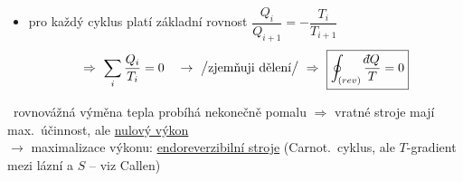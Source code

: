 \begin{itemize}
  \item pro každý  cyklus platí základní rovnost \quad $\dfrac{Q_i}{Q_{i+1}} = -\dfrac{T_i}{T_{i+1}}$
  \[
    \Rightarrow\ \sum_i\frac{Q_i}{T_i} = 0 \quad\to\ \big/\text{zjemňuji dělení}\big/ \ \Rightarrow\
    \boxed{\oint_{(rev)}\frac{\dbar Q}{T} = 0}
  \]
\end{itemize}

\pozor{!}\ rovnovážná výměna tepla probíhá nekonečně pomalu $\Rightarrow$ vratné stroje mají max.\ účinnost, ale \underline{nulový výkon} \\
$\to$ maximalizace výkonu: \underline{endoreverzibilní stroje} (Carnot.\ cyklus, ale $T$-gradient mezi lázní a $S$ -- viz Callen)

